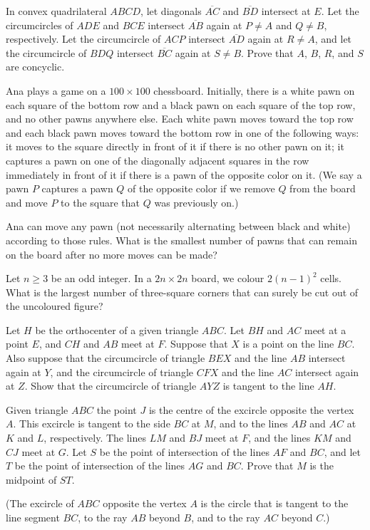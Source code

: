 \documentclass[11pt]{scrartcl}
\begin{document}
\begin{problem}[689941395946854]
	In convex quadrilateral $ABCD$, let diagonals $\overline{AC}$ and $\overline{BD}$ intersect at $E$. Let the circumcircles of $ADE$ and $BCE$ intersect $\overline{AB}$ again at $P \neq A$ and $Q \neq B$, respectively. Let the circumcircle of $ACP$ intersect $\overline{AD}$ again at $R \neq A$, and let the circumcircle of $BDQ$ intersect $\overline{BC}$ again at $S \neq B$. Prove that $A$, $B$, $R$, and $S$ are concyclic.
\end{problem}
\begin{problem}[7205358409203299180]
	Ana plays a game on a $100\times 100$ chessboard. Initially, there is a white pawn on each square of the bottom row and a black pawn on each square of the top row, and no other pawns anywhere else.
Each white pawn moves toward the top row and each black pawn moves toward the bottom row in one of the following ways:
it moves to the square directly in front of it if there is no other pawn on it;
it captures a pawn on one of the diagonally adjacent squares in the row immediately in front of it if there is a pawn of the opposite color on it.
(We say a pawn $P$ captures a pawn $Q$ of the opposite color if we remove $Q$ from the board and move $P$ to the square that $Q$ was previously on.)

Ana can move any pawn (not necessarily alternating between black and white) according to those rules. What is the smallest number of pawns that can remain on the board after no more moves can be made?
\end{problem}
\begin{problem}[6837149463099766937]
	Let $n \ge 3$ be an odd integer. In a $2n \times 2n$ board, we colour $2(n-1)^2$ cells. What is the largest number of three-square corners that can surely be cut out of the uncoloured figure?
\end{problem}
\begin{problem}[119129720704350]
Let $H$ be the orthocenter of a given triangle $ABC$. Let $BH$ and $AC$ meet at a point $E$, and $CH$ and $AB$ meet at $F$. Suppose that $X$ is a point on the line $BC$. Also suppose that the circumcircle of triangle $BEX$ and the line $AB$ intersect again at $Y$, and the circumcircle of triangle $CFX$ and the line $AC$ intersect again at $Z$.
Show that the circumcircle of triangle $AYZ$ is tangent to the line $AH$.
\end{problem}
\begin{problem}[201785415121070]
	Given triangle $ABC$ the point $J$ is the centre of the excircle opposite the vertex $A.$ This excircle is tangent to the side $BC$ at $M$, and to the lines $AB$ and $AC$ at $K$ and $L$, respectively. The lines $LM$ and $BJ$ meet at $F$, and the lines $KM$ and $CJ$ meet at $G.$ Let $S$ be the point of intersection of the lines $AF$ and $BC$, and let $T$ be the point of intersection of the lines $AG$ and $BC.$ Prove that $M$ is the midpoint of $ST.$

(The excircle of $ABC$ opposite the vertex $A$ is the circle that is tangent to the line segment $BC$, to the ray $AB$ beyond $B$, and to the ray $AC$ beyond $C$.)
\end{problem}
\end{document}

